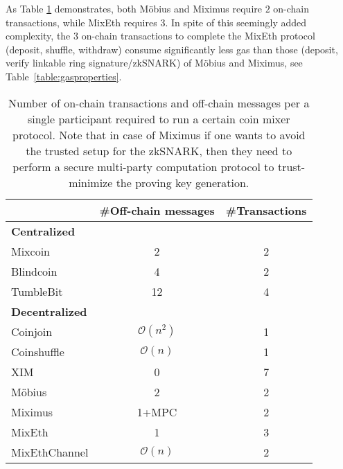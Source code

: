 \documentclass[a4paper,UKenglish,cleveref, autoref]{oasics-v2019}
\begin{document}
As Table \ref{table:communicationcomplexity} demonstrates, both Möbius and Miximus require $2$ on-chain transactions, while MixEth requires $3$. In spite of this seemingly added complexity, the 3 on-chain transactions to complete the MixEth protocol (deposit, shuffle, withdraw) consume significantly less gas than those (deposit, verify linkable ring signature/zkSNARK) of Möbius and Miximus, see Table~\ref{table:gasproperties}. 
\begin{table}[H] 
	\caption{Number of on-chain transactions and off-chain messages per a single participant required to run a certain coin mixer protocol. Note that in case of Miximus if one wants to avoid the trusted setup for the zkSNARK, then they need to perform a secure multi-party computation protocol to trust-minimize the proving key generation.}
	\centering 
	\begin{tabular}{lcc} 
		
		\toprule
		&\#Off-chain messages& \#Transactions \\
		\midrule
		\textbf{Centralized} & & \\
		\midrule
		Mixcoin \cite{bonneau2014mixcoin} & 2      & 2       \\
		Blindcoin \cite{valenta2015blindcoin} & 4      & 2       \\
		TumbleBit \cite{heilman2017tumblebit} & 12      & 4      \\
		\midrule
		\textbf{Decentralized}      &    &      \\
		\midrule
		Coinjoin \cite{maxwell2013coinjoin} &  $\mathcal{O}(n^2)$     & 1       \\
		Coinshuffle \cite{ruffing2014coinshuffle} &$\mathcal{O}(n)$       & 1       \\
		XIM \cite{bissias2014sybil} & 0      & 7       \\
		Möbius \cite{meiklejohn2018mobius} & 2    & 2       \\
		Miximus \cite{miximus2018} & 1+MPC & 2 \\
		MixEth & 1 & 3 \\
		MixEthChannel  & $\mathcal{O}(n)$ &2 \\
		\bottomrule
	\end{tabular}
	\label{table:communicationcomplexity}
\end{table}     

\newpage

\end{document}
